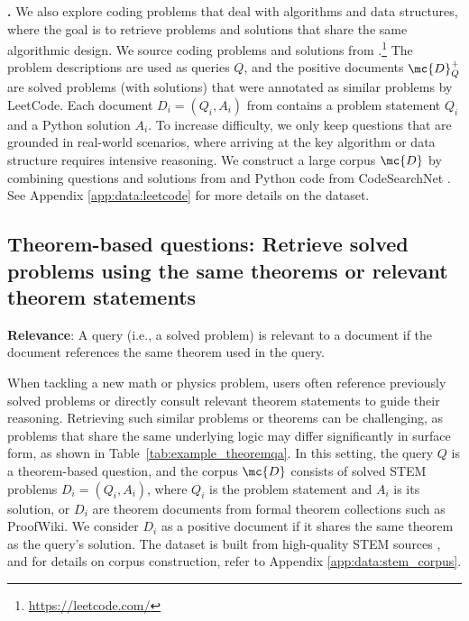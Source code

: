 \textbf{\leetcode.}
We also explore coding problems that deal with algorithms and data structures, where the goal is to retrieve problems and solutions that share the same algorithmic design.
We source coding problems and solutions from \leetcode.\footnote{\url{https://leetcode.com/}} The problem descriptions are used as queries $Q$, and the positive documents $\mc{D}_Q^+$ are solved problems (with solutions) that were annotated as similar problems by LeetCode.
Each document $D_i = (Q_i, A_i)$ from \leetcode contains a problem statement $Q_i$ and a Python solution $A_i$.
To increase difficulty, we only keep questions that are grounded in real-world scenarios, where arriving at the key algorithm or data structure requires intensive reasoning.
We construct a large corpus $\mc{D}$ by combining questions and solutions from \leetcode and Python code from CodeSearchNet \citep{husain2019codesearchnet}. See Appendix \ref{app:data:leetcode} for more details on the dataset.


\vspace{-8pt}
\subsection{Theorem-based questions: Retrieve solved problems using the same theorems or relevant theorem statements}
\begin{relevance}
\textbf{Relevance}: A query (i.e., a solved problem) is relevant to a document if the document references the same theorem used in the query.
\end{relevance}
\label{sec:theorem}
When tackling a new math or physics problem, users often reference previously solved problems or directly consult relevant theorem statements to guide their reasoning. Retrieving such similar problems or theorems can be challenging, as problems that share the same underlying logic may differ significantly in surface form, as shown in Table~\ref{tab:example_theoremqa}.
In this setting, the query $Q$ is a theorem-based question, and the corpus $\mc{D}$ consists of solved STEM problems $D_i = (Q_i, A_i)$, where $Q_i$ is the problem statement and $A_i$ is its solution, or $D_i$ are theorem documents from formal theorem collections such as ProofWiki. We consider $D_i$ as a positive document if it shares the same theorem as the query's solution. The dataset is built from high-quality STEM sources \citep{cobbe2021training,yuan2023scaling,hendrycks2021measuring,ling-etal-2017-program,chen-etal-2023-theoremqa,li2023camel}, and for details on corpus construction, refer to Appendix \ref{app:data:stem_corpus}.

